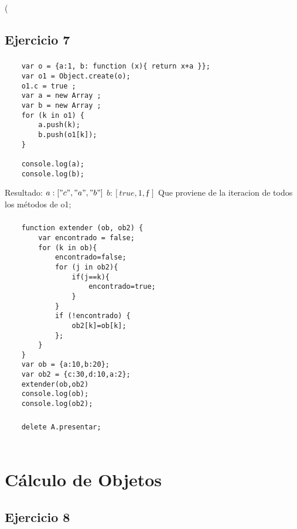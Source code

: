 \left( \documentclass[10pt,a4paper]{article}
\begin{document}
\subsection{Ejercicio 7}
\subsubsection{}
    \begin{lstlisting}
    var o = {a:1, b: function (x){ return x+a }};
    var o1 = Object.create(o);
    o1.c = true ;
    var a = new Array ;
    var b = new Array ;
    for (k in o1) {
    	a.push(k); 
    	b.push(o1[k]);
    }
    
    console.log(a);
    console.log(b);
\end{lstlisting}
Resultado:
$a:["c", "a", "b"]$
$b:[true, 1, ƒ]$
Que proviene de la iteracion de todos los métodos de o1;
\subsubsection{}
    \begin{lstlisting}
    function extender (ob, ob2) {
    	var encontrado = false;
    	for (k in ob){
    		encontrado=false;
    		for (j in ob2){
    			if(j==k){
    				encontrado=true;
    			}
    		}
    		if (!encontrado) {
    			ob2[k]=ob[k];
    		};
    	} 
    }
    var ob = {a:10,b:20};
    var ob2 = {c:30,d:10,a:2};
    extender(ob,ob2)
    console.log(ob);
    console.log(ob2);
    \end{lstlisting}
\subsubsection{}
    \begin{lstlisting}
    delete A.presentar;
    \end{lstlisting}
\subsubsection{}
    \begin{lstlisting}
    \end{lstlisting}

\section*{\centering Cálculo de Objetos}

\subsection{Ejercicio 8}
\end{document}
